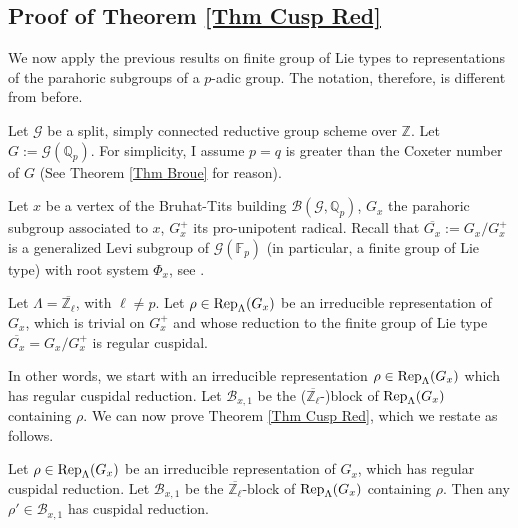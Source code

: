 	

	
	
	
	\subsection{Proof of Theorem \ref{Thm Cusp Red}}
	
	We now apply the previous results on finite group of Lie types to representations of the parahoric subgroups of a $p$-adic group. The notation, therefore, is different from before.
	
	Let $\mathcal{G}$ be a split, simply connected reductive group scheme over $\mathbb{Z}$. Let $G:=\mathcal{G}(\mathbb{Q}_p)$. For simplicity, I assume $p=q$ is greater than the Coxeter number of $G$ (See Theorem \ref{Thm Broue} for reason).
	
	Let $x$ be a vertex of the Bruhat-Tits building $\mathcal{B}(\mathcal{G}, \mathbb{Q}_p)$, $G_x$ the parahoric subgroup associated to $x$, $G_x^+$ its pro-unipotent radical. Recall that $\overline{G_x}:=G_x/G_x^+$ is a generalized Levi subgroup of $\mathcal{G}(\mathbb{F}_p)$ (in particular, a finite group of Lie type) with root system $\Phi_x$, see \cite[Theorem 3.17]{rabinoff2003bruhat}. 
	
	Let $\Lambda=\overline{\mathbb{Z}_\ell}$, with $\ell \neq p$. Let $\rho \in \operatorname{\operatorname{Rep}}_{\Lambda}(G_x)$ be an irreducible representation of $G_x$, which is trivial on $G_x^+$ and whose reduction to the finite group of Lie type $\overline{G_x}=G_x/G_x^+$ is regular cuspidal. 
	
	
	In other words, we start with an irreducible representation $\rho \in \operatorname{\operatorname{Rep}}_{\Lambda}(G_x)$ which has regular cuspidal reduction. Let $\mathcal{B}_{x,1}$ be the ($\overline{\mathbb{Z}_{\ell}}$-)block of $\operatorname{\operatorname{Rep}}_{\Lambda}(G_x)$ containing $\rho$. We can now prove Theorem \ref{Thm Cusp Red}, which we restate as follows.
	
	\begin{theorem}
		Let $\rho \in \operatorname{\operatorname{Rep}}_{\Lambda}(G_x)$ be an irreducible representation of $G_x$, which has regular cuspidal reduction. Let $\mathcal{B}_{x,1}$ be the $\overline{\mathbb{Z}_{\ell}}$-block of $\operatorname{\operatorname{Rep}}_{\Lambda}(G_x)$ containing $\rho$. Then any $\rho' \in \mathcal{B}_{x,1}$ has cuspidal reduction.
	\end{theorem}
	

